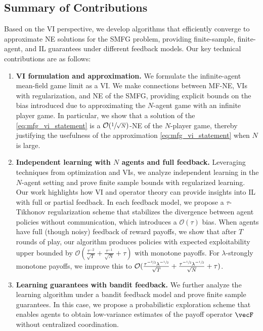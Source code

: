 \subsection{Summary of Contributions}
Based on the VI perspective, we develop algorithms that efficiently converge to approximate NE solutions for the SMFG problem, providing finite-sample, finite-agent, and IL guarantees under different feedback models.
Our key technical contributions are as follows:
\begin{enumerate}
    \item \textbf{VI formulation and approximation.} We formulate the infinite-agent mean-field game limit as a VI.
    We make connections between MF-NE, VIs with regularization, and NE of the SMFG, providing explicit bounds on the bias introduced due to approximating the $N$-agent game with an infinite player game.
    In particular, we show that a solution of the \eqref{eq:mfg_vi_statement} is a $\mathcal{O}(\sfrac{1}{\sqrt{N}})$-NE of the $N$-player game, thereby justifying the usefulness of the approximation \eqref{eq:mfg_vi_statement} when $N$ is large.
    \item \textbf{Independent learning with $N$ agents and full feedback.} Leveraging techniques from optimization and VIs, we analyze independent learning in the $N$-agent setting and prove finite sample bounds with regularized learning. Our work highlights how VI and operator theory can provide insights into IL with full or partial feedback.
    In each feedback model, we propose a $\tau$-Tikhonov regularization scheme that stabilizes the divergence between agent policies without communication, which introduces a $\mathcal{O}(\tau)$ bias.
   When agents have full (though noisy) feedback of reward payoffs, we show that after $T$ rounds of play, our algorithm produces policies with expected exploitability upper bounded by $\mathcal{O} (\frac{\tau^{-2}}{\sqrt{T}}+ \frac{\tau^{-1}}{\sqrt{N}} + \tau)$ with monotone payoffs. 
    For $\lambda$-strongly monotone payoffs, we improve this to $\mathcal{O} (\frac{\tau^{-\sfrac{3}{2}} \lambda^{-\sfrac{1}{2}}}{\sqrt{T}} + \frac{\tau^{-\sfrac{1}{2}} \lambda^{-\sfrac{1}{2}}}{\sqrt{N}} + \tau)$.
    \item \textbf{Learning guarantees with bandit feedback.} We further analyze the learning algorithm under a bandit feedback model and prove finite sample guarantees.
    In this case, we propose a probabilistic exploration scheme that enables agents to obtain low-variance estimates of the payoff operator $\vecF$ without centralized coordination.

\end{enumerate}
